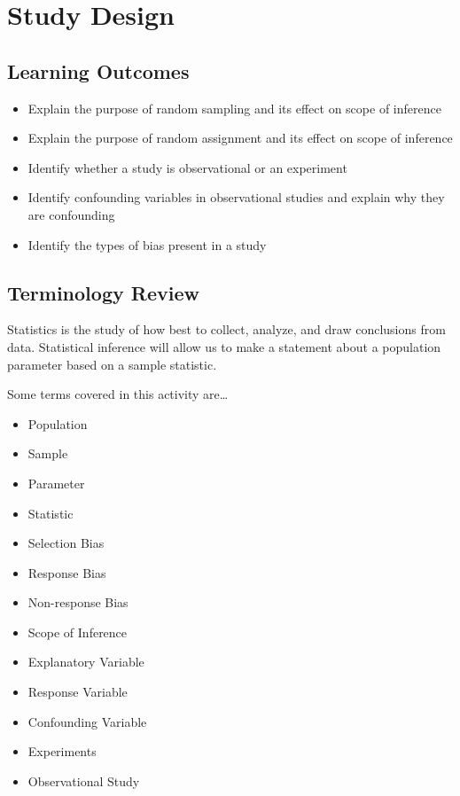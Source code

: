 \documentclass[
]{report}
\begin{document}
\hypertarget{study-design}{%
\chapter{Study Design}\label{study-design}}

\hypertarget{learning-outcomes-1}{%
\section{Learning Outcomes}\label{learning-outcomes-1}}

\begin{itemize}
\item
  Explain the purpose of random sampling and its effect on scope of inference
\item
  Explain the purpose of random assignment and its effect on scope of inference
\item
  Identify whether a study is observational or an experiment
\item
  Identify confounding variables in observational studies and explain why they are confounding
\item
  Identify the types of bias present in a study
\end{itemize}

\hypertarget{terminology-review}{%
\section{Terminology Review}\label{terminology-review}}

Statistics is the study of how best to collect, analyze, and draw conclusions from data. Statistical inference will allow us to make a statement about a population parameter based on a sample statistic.

Some terms covered in this activity are\ldots{}

\begin{itemize}
\item
  Population
\item
  Sample
\item
  Parameter
\item
  Statistic
\item
  Selection Bias
\item
  Response Bias
\item
  Non-response Bias
\item
  Scope of Inference
\item
  Explanatory Variable
\item
  Response Variable
\item
  Confounding Variable
\item
  Experiments
\item
  Observational Study
\end{itemize}
\end{document}
